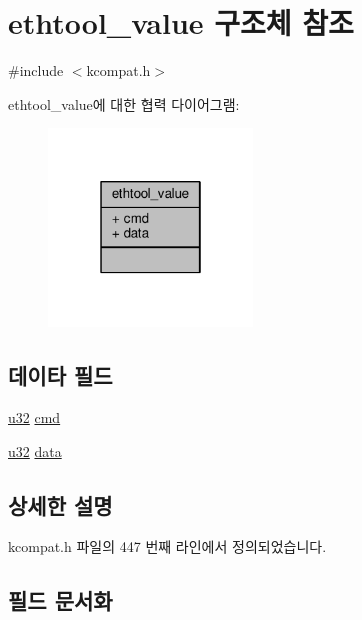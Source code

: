 \hypertarget{structethtool__value}{}\section{ethtool\+\_\+value 구조체 참조}
\label{structethtool__value}


{\ttfamily \#include $<$kcompat.\+h$>$}



ethtool\+\_\+value에 대한 협력 다이어그램\+:
\nopagebreak
\begin{figure}[H]
\begin{center}
\leavevmode
\includegraphics[width=154pt]{structethtool__value__coll__graph}
\end{center}
\end{figure}
\subsection*{데이타 필드}
\begin{DoxyCompactItemize}
\item 
\hyperlink{lib_2igb_2e1000__osdep_8h_a64e91c10a0d8fb627e92932050284264}{u32} \hyperlink{structethtool__value_a62fe2a1dbf17d5a8561a5a7f5a97a9ba}{cmd}
\item 
\hyperlink{lib_2igb_2e1000__osdep_8h_a64e91c10a0d8fb627e92932050284264}{u32} \hyperlink{structethtool__value_a0e5b72ac4f845f11204b39c8fb0f5d91}{data}
\end{DoxyCompactItemize}


\subsection{상세한 설명}


kcompat.\+h 파일의 447 번째 라인에서 정의되었습니다.



\subsection{필드 문서화}
